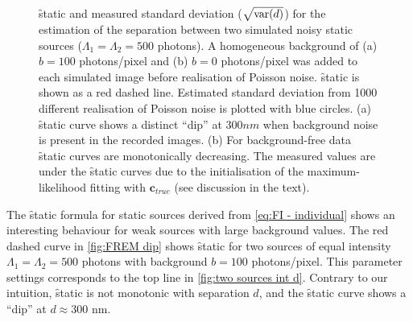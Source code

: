 \begin{figure}[!bh]
	\centering
	\newcommand{\wf}{.45\textwidth}
	\caption{\f{static} and measured standard deviation ($\sqrt{\mathrm{var}(d)}$) for the estimation of the separation between two simulated noisy static sources ($\Lambda_1=\Lambda_2=500$ photons). A homogeneous background of (a) $b=100$ photons/pixel and (b) $b=0$ photons/pixel was added to each simulated image before realisation of Poisson noise.  \f{static} is shown as a red dashed line. Estimated standard deviation from 1000 different realisation of Poisson noise is plotted with blue circles. (a) \f{static} curve shows a distinct ``dip'' at $300 \unit{nm}$ when background noise is present in the recorded images. (b) For background-free data \f{static} curves are monotonically decreasing. The measured values are under the \f{static} curves due to the initialisation of the maximum-likelihood fitting with $\bm{c}_{true}$ (see discussion in the text).}
	\label{fig:FREM dip both}
\end{figure}
%
The \f{static} formula for static sources derived from \autoref{eq:FI - individual} shows an interesting behaviour for weak sources with large background values. The red dashed curve in \autoref{fig:FREM dip} shows \f{static} for two sources of equal intensity $\Lambda_1=\Lambda_2=500$ photons with background $b=100$ photons/pixel. This parameter settings corresponds to the top line in \autoref{fig:two sources int d}. Contrary to our intuition, \f{static} is not monotonic with separation $d$, and the \f{static} curve shows a ``dip'' at $d\approx300$ nm.

